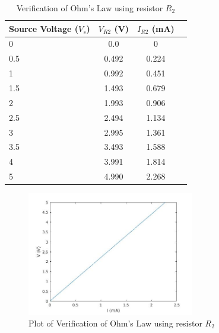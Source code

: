 \documentclass{article}
\begin{document}
        
      \begin{table}[!ht]
  \captionsetup{font=large}
  \centering
  \caption{ Verification of Ohm's Law using resistor $R_2$ }
  \label{tab: ohm2 }
  \begin{tabular}{   | l | c | c | r | }
  \hline

      Source Voltage ($V_s$) &     $V_{R2}$ (V) &    $I_{R2}$ (mA)     \\ \hline
      0 &    0.0 &    0     \\ \hline
      0.5 &     0.492 &    0.224     \\ \hline
      1 &    0.992 &    0.451     \\ \hline
      1.5 &    1.493 &    0.679     \\ \hline
      2 &    1.993 &    0.906     \\ \hline
      2.5 &    2.494 &    1.134     \\ \hline
      3 &    2.995 &    1.361     \\ \hline
      3.5 &    3.493 &    1.588     \\ \hline
      4 &    3.991 &    1.814     \\ \hline
      5 &    4.990 &    2.268     \\ \hline
  
  \end{tabular}
  \end{table}



    \begin{figure}[!ht]
  \centering
  \caption{Plot of Verification of Ohm's Law using resistor $R_2$\label{fig:resultPlot2}}
  \includegraphics[width=0.65\textwidth]{img/plot2.jpg}
  \end{figure}


        
  
\end{document}
